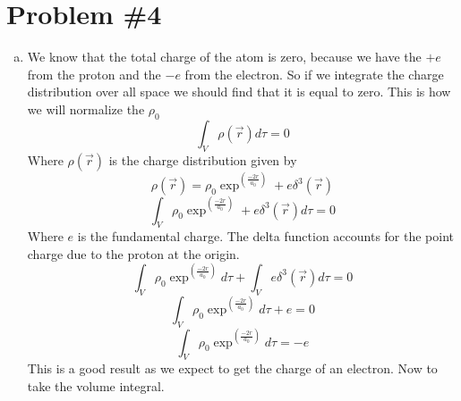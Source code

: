 \documentclass[11pt]{article}
\numberwithin{equation}{section}
\begin{document}
\section{Problem \#4}
\begin{enumerate}[(a)]
\item 
We know that the total charge of the atom is zero, because we have the $+e$ from the proton and the $-e$ from the electron. So if we integrate the charge distribution over all space we should find that it is equal to zero. This is how we will normalize the $\rho_0$
$$\int_V \rho(\vec{r}) d\tau = 0$$
Where $\rho(\vec{r})$ is the charge distribution given by
\begin{equation}
\rho(\vec{r}) = \rho_0\exp^{\left(\frac{-2r}{a_0}\right)} + e\delta^3(\vec{r})
\label{chargedist}
\end{equation}
$$\int_V \rho_0\exp^{\left(\frac{-2r}{a_0}\right)} + e\delta^3(\vec{r})d\tau = 0$$
Where $e$ is the fundamental charge. The delta function accounts for the point charge due to the proton at the origin.
$$\int_V \rho_0\exp^{\left(\frac{-2r}{a_0}\right)}d\tau + \int_Ve\delta^3(\vec{r})d\tau = 0$$
$$\int_V \rho_0\exp^{\left(\frac{-2r}{a_0}\right)}d\tau + e = 0$$
$$\int_V \rho_0\exp^{\left(\frac{-2r}{a_0}\right)}d\tau = -e $$
This is a good result as we expect to get the charge of an electron. Now to take the volume integral.


\end{enumerate}
\end{document}
